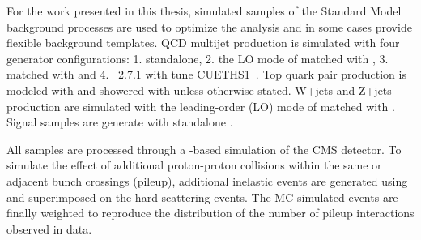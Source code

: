For the work presented in this thesis, simulated samples of the Standard Model background processes are used to optimize the analysis and in some cases provide flexible background templates. QCD multijet production is simulated with four generator configurations: 1. \PYTHIA standalone, 2. the LO mode of \MADGRAPH matched with \PYTHIA, 3. \POWHEG matched with \PYTHIA and 4. \HERWIG{++}~2.7.1 with tune CUETHS1~\cite{Khachatryan:2015pea}. Top quark pair production is modeled with \POWHEG and showered with \PYTHIA unless otherwise stated. W+jets and Z+jets production are simulated with the leading-order (LO) mode of \MADGRAPH matched with \PYTHIA. Signal samples are generate with standalone \PYTHIA.

All samples are processed through a \GEANTfour-based simulation of the CMS detector. To simulate the effect of additional proton-proton collisions within the same or adjacent bunch crossings (pileup), additional inelastic events are generated using \PYTHIA and superimposed on the hard-scattering events. The MC simulated events are finally weighted to reproduce the distribution of the number of pileup interactions observed in data.
